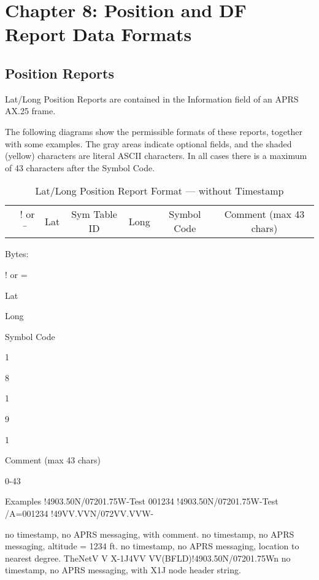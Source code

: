 \chapter{Chapter 8: Position and DF Report Data Formats}




\section{Position Reports}

Lat/Long Position Reports are contained in the Information field of an APRS AX.25 frame.

The following diagrams show the permissible formats of these reports,
together with some examples. The gray areas indicate optional fields, and the
shaded (yellow) characters are literal ASCII characters. In all cases there is a
maximum of 43 characters after the Symbol Code.

 \begin{table}

  \begin{tabular}{r|c|c|c|c|c|c|}
    & ! or \= & Lat & Sym Table ID & Long & Symbol Code & Comment (max 43 chars) \\
   \end{tabular}
  \caption{Lat/Long Position Report Format — without Timestamp}
 \end{table}


 

Bytes:  
    
! or
=

Lat



Long

Symbol
Code

1

8

1

9

1

Comment
(max 43 chars)

0-43

Examples
!4903.50N/07201.75W-Test 001234
!4903.50N/07201.75W-Test /A=001234
!49VV.VVN/072VV.VVW-

no timestamp, no APRS messaging, with comment.
no timestamp, no APRS messaging, altitude = 1234 ft.
no timestamp, no APRS messaging, location to
nearest degree.
TheNetV
V X-1J4VV
VV(BFLD)!4903.50N/07201.75Wn no timestamp, no APRS messaging,
with X1J node header string.



